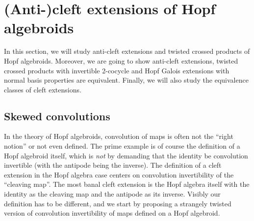 \documentclass[a4paper,reqno]{amsart}
\numberwithin{equation}{section}
\theoremstyle{plain}
\theoremstyle{remark}
\numberwithin{equation}{section}
\begin{document}
\section{(Anti-)cleft extensions of Hopf algebroids}

In this section, we will study anti-cleft extensions and twisted crossed products of Hopf algebroids. Moreover, we are going to show anti-cleft extensions, twisted crossed products with invertible 2-cocycle and Hopf Galois extensions with normal basis properties are equivalent. Finally, we will also study the equivalence classes of cleft extensions.


\subsection{Skewed convolutions}

 In the theory of Hopf algebroids, convolution of maps is often not the ``right notion'' or not even defined. The prime example is of course the definition of a Hopf algebroid itself, which is \emph{not} by demanding that the identity be convolution invertible (with the antipode being the inverse). The definition of a cleft extension in the Hopf algebra case centers on convolution invertibility of the ``cleaving map''. The most banal cleft extension is the Hopf algebra itself with the identity as the cleaving map and the antipode as its inverse. Visibly our definition has to be different, and we start by proposing a strangely twisted version of convolution invertibility of maps defined on a Hopf algebroid.
\end{document}
